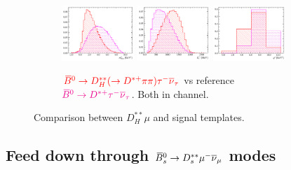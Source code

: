 \begin{figure}[!htb]
    \begin{subfigure}{\textwidth}
        \centering
        \includegraphics[width=0.3\textwidth]{figs-fit-fit-templates/histo-comp/Dst_iso_DstTau__vs__Dst_iso_DststHMuDst__m2miss.pdf}
        \includegraphics[width=0.3\textwidth]{figs-fit-fit-templates/histo-comp/Dst_iso_DstTau__vs__Dst_iso_DststHMuDst__el.pdf}
        \includegraphics[width=0.3\textwidth]{figs-fit-fit-templates/histo-comp/Dst_iso_DstTau__vs__Dst_iso_DststHMuDst__q2.pdf}
        \caption{
            $\textcolor{red}{{{\kern 0.18em\overline{\kern -0.18em B}}{}^0} \rightarrow {\ensuremath{D}}_H^{**} (\rightarrow {\ensuremath{{D}^{*+}}}\pi\pi) {\tau^-}{{\overline{\nu}}_\tau}}$
            vs reference
            $\textcolor{magenta}{{{\kern 0.18em\overline{\kern -0.18em B}}{}^0} \rightarrow {\ensuremath{{D}^{*+}}}{\ensuremath{\tau^-}}{\ensuremath{{\overline{\nu}}_\tau}}}$.
            Both in \Dstar channel.
        }
    \end{subfigure}

    \caption{Comparison between $D_H^{**}\mu$ and \Dz\taum signal templates.}
    \label{fig:dstst-heavy}
\end{figure}


\subsection{Feed down through ${{\kern 0.18em\overline{\kern -0.18em B}}{}^0_{s}} \rightarrow D_s^{**}{\mu^-}{{\overline{\nu}}_\mu}$ modes}

